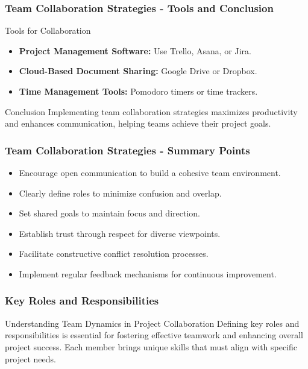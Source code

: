 \documentclass[aspectratio=169]{beamer}
\begin{document}
\begin{frame}[fragile]
    \frametitle{Team Collaboration Strategies - Tools and Conclusion}
    \begin{block}{Tools for Collaboration}
        \begin{itemize}
            \item \textbf{Project Management Software:} Use Trello, Asana, or Jira.
            \item \textbf{Cloud-Based Document Sharing:} Google Drive or Dropbox.
            \item \textbf{Time Management Tools:} Pomodoro timers or time trackers.
        \end{itemize}
    \end{block}
    \begin{block}{Conclusion}
        Implementing team collaboration strategies maximizes productivity and enhances communication, helping teams achieve their project goals.
    \end{block}
\end{frame}

\begin{frame}[fragile]
    \frametitle{Team Collaboration Strategies - Summary Points}
    \begin{itemize}
        \item Encourage open communication to build a cohesive team environment.
        \item Clearly define roles to minimize confusion and overlap.
        \item Set shared goals to maintain focus and direction.
        \item Establish trust through respect for diverse viewpoints.
        \item Facilitate constructive conflict resolution processes.
        \item Implement regular feedback mechanisms for continuous improvement.
    \end{itemize}
\end{frame}

\begin{frame}[fragile]
    \frametitle{Key Roles and Responsibilities}
    \begin{block}{Understanding Team Dynamics in Project Collaboration}
        Defining key roles and responsibilities is essential for fostering effective teamwork and enhancing overall project success. Each member brings unique skills that must align with specific project needs.
    \end{block}
\end{frame}
\end{document}
